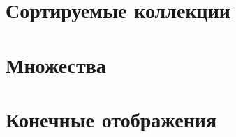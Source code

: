 \section{Сортируемые коллекции}

\codesep


\section{Множества}

\codesep

\codesep


\section{Конечные отображения}

\codesep

\codesep


